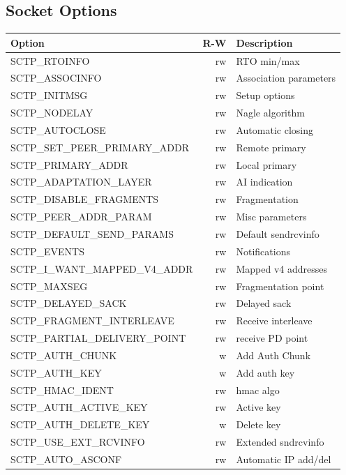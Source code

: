 \documentclass[conference]{IEEEtran}
\begin{document}
\subsection{Socket Options}

\begin{table}
\begin{tabular}{|l|r|l|}
\hline
Option & R-W & Description\\
\hline \hline
SCTP\_RTOINFO & rw & RTO min/max\\
\hline
SCTP\_ASSOCINFO & rw & Association parameters\\
\hline
SCTP\_INITMSG & rw & Setup options\\
\hline
SCTP\_NODELAY & rw & Nagle algorithm\\
\hline
SCTP\_AUTOCLOSE & rw & Automatic closing\\
\hline
SCTP\_SET\_PEER\_PRIMARY\_ADDR & rw & Remote primary\\
\hline
SCTP\_PRIMARY\_ADDR & rw & Local primary\\
\hline
SCTP\_ADAPTATION\_LAYER & rw & AI indication\\
\hline
SCTP\_DISABLE\_FRAGMENTS & rw & Fragmentation\\
\hline
SCTP\_PEER\_ADDR\_PARAM & rw & Misc parameters\\
\hline
SCTP\_DEFAULT\_SEND\_PARAMS & rw & Default sendrcvinfo\\
\hline
SCTP\_EVENTS & rw & Notifications\\
\hline
SCTP\_I\_WANT\_MAPPED\_V4\_ADDR & rw & Mapped v4 addresses\\
\hline
SCTP\_MAXSEG & rw & Fragmentation point\\
\hline
SCTP\_DELAYED\_SACK & rw & Delayed sack\\
\hline
SCTP\_FRAGMENT\_INTERLEAVE & rw & Receive interleave\\
\hline
SCTP\_PARTIAL\_DELIVERY\_POINT & rw & receive PD point\\
\hline
SCTP\_AUTH\_CHUNK & w & Add Auth Chunk\\
\hline
SCTP\_AUTH\_KEY & w & Add auth key\\
\hline
SCTP\_HMAC\_IDENT & rw & hmac algo\\
\hline
SCTP\_AUTH\_ACTIVE\_KEY & rw & Active key\\
\hline
SCTP\_AUTH\_DELETE\_KEY & w & Delete key\\
\hline
SCTP\_USE\_EXT\_RCVINFO & rw & Extended sndrcvinfo\\
\hline
SCTP\_AUTO\_ASCONF & rw & Automatic IP add/del\\

\end{tabular}
\end{table}
\end{document}

